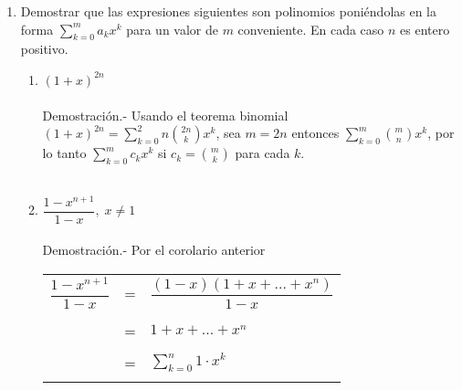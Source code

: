 \begin{enumerate}
        \item Demostrar que las expresiones siguientes son polinomios poniéndolas en la forma $\displaystyle\sum_{k=0}^m a_k x^k$ para un valor de $m$ conveniente. En cada caso $n$ es entero positivo.
            \begin{enumerate}[\bfseries (a)]
                \item $(1+x)^{2n}$\\\\
                Demostración.- \; Usando el teorema binomial $(1+x)^{2n} = \displaystyle\sum_{k=0}^2n {2n \choose k} x^k$, sea $m=2n$ entonces $\displaystyle\sum_{k=0}^m {m \choose n} x^k$, por lo tanto $\displaystyle\sum_{k=0}^m c_k x^k$ si $c_k = {m \choose k} $ para cada $k$.\\\\

                \item $\dfrac{1- x^{n+1}}{1-x}, \; x \neq 1$\\\\
                Demostración.- \; Por el corolario anterior 
                    \begin{center}
                        \begin{tabular}{r c l}
                            $\dfrac{1 - x^{n+1}}{1-x}$&=&$\dfrac{(1-x)(1+x+...+x^n)}{1-x}$\\\\
                            &=&$1 + x + ... + x^n$\\\\
                            &=&$\displaystyle\sum_{k=0}^n 1 \cdot x^k$\\\\
                        \end{tabular}
                    \end{center}


\end{enumerate}
\end{enumerate}
